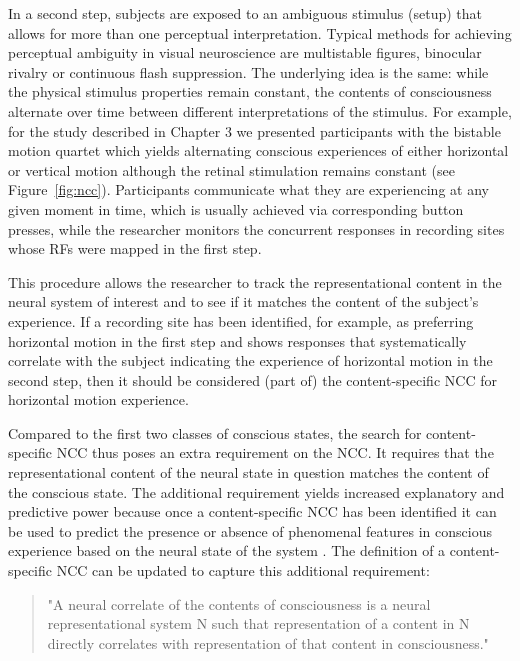 In a second step, subjects are exposed to an ambiguous stimulus (setup) that allows for more than one perceptual interpretation. Typical methods for achieving perceptual ambiguity in visual neuroscience are multistable figures, binocular rivalry or continuous flash suppression. The underlying idea is the same: while the physical stimulus properties remain constant, the contents of consciousness alternate over time between different interpretations of the stimulus. For example, for the study described in Chapter 3 we presented participants with the bistable motion quartet \parencite{Ramachandran1985} which yields alternating conscious experiences of either horizontal or vertical motion although the retinal stimulation remains constant (see Figure~\ref{fig:ncc}). Participants communicate what they are experiencing at any given moment in time, which is usually achieved via corresponding button presses, while the researcher monitors the concurrent responses in recording sites whose RFs were mapped in the first step.

This procedure allows the researcher to track the representational content in the neural system of interest and to see if it matches the content of the subject's experience. If a recording site has been identified, for example, as preferring horizontal motion in the first step and shows responses that systematically correlate with the subject indicating the experience of horizontal motion in the second step, then it should be considered (part of) the content-specific NCC for horizontal motion experience.

Compared to the first two classes of conscious states, the search for content-specific NCC thus poses an extra requirement on the NCC. It requires that the representational content of the neural state in question matches the content of the conscious state. The additional requirement yields increased explanatory and predictive power because once a content-specific NCC has been identified it can be used to predict the presence or absence of phenomenal features in conscious experience based on the neural state of the system \parencite{Chalmers2000}. The definition of a content-specific NCC can be updated to capture this additional requirement:

\begin{quotation}
"A neural correlate of the contents of consciousness is a neural representational system N such that representation of a content in N directly correlates with representation of that content in consciousness." \parencite[p. 6]{Chalmers2000}
\end{quotation}

